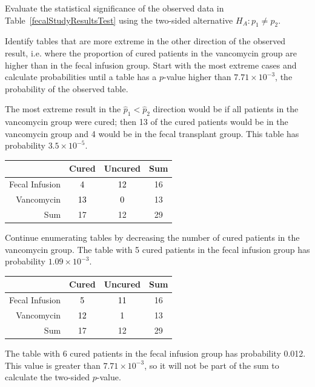 \begin{example}{Evaluate the statistical significance of the observed data in Table~\ref{fecalStudyResultsTest} using the two-sided alternative $H_A: p_1 \neq p_2$.}
	
Identify tables that are more extreme in the other direction of the observed result, i.e. where the proportion of cured patients in the vancomycin group are higher than in the fecal infusion group. Start with the most extreme cases and calculate probabilities until a table has a $p$-value higher than $7.71 \times 10^{-3}$, the probability of the observed table. 

The most extreme result in the $\hat{p}_1 < \hat{p}_2$ direction would be if all patients in the vancomycin group were cured; then 13 of the cured patients would be in the vancomycin group and 4 would be in the fecal transplant group. This table has probability $3.5 \times 10^{-5}$.

\begin{table}[h]
	\centering
	\color{gray}
	\begin{tabular}{r|cc|c}
		\hline
		& Cured & Uncured & Sum \\ 
		\hline
		Fecal Infusion & \textcolor{black}{4} & \textcolor{black}{12} & 16 \\ 
		Vancomycin & \textcolor{black}{13} & \textcolor{black}{0} & 13 \\ 
		\hline
		Sum & 17 & 12 & 29 \\ 
		\hline
	\end{tabular}
\end{table}

Continue enumerating tables by decreasing the number of cured patients in the vancomycin group. The table with 5 cured patients in the fecal infusion group has probability $1.09 \times 10^{-3}$.

\begin{table}[h]
	\centering
	\color{gray}
	\begin{tabular}{r|cc|c}
		\hline
		& Cured & Uncured & Sum \\ 
		\hline
		Fecal Infusion & \textcolor{black}{5} & \textcolor{black}{11} & 16 \\ 
		Vancomycin & \textcolor{black}{12} & \textcolor{black}{1} & 13 \\ 
		\hline
		Sum & 17 & 12 & 29 \\ 
		\hline
	\end{tabular}
\end{table}

The table with 6 cured patients in the fecal infusion group has probability 0.012. This value is greater than $7.71 \times 10^{-3}$, so it will not be part of the sum to calculate the two-sided $p$-value.
	

\end{example}
